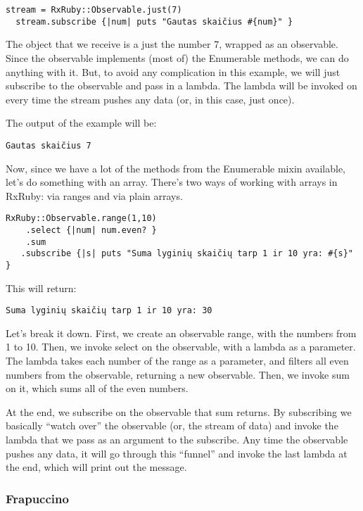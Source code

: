 \begin{lstlisting}[]
  stream = RxRuby::Observable.just(7)
  stream.subscribe {|num| puts "Gautas skaičius #{num}" }
\end{lstlisting}

The object that we receive is a just the number 7, wrapped as an observable. Since the observable implements (most of) the Enumerable methods, we can do anything with it. But, to avoid any complication in this example, we will just subscribe to the observable and pass in a lambda. The lambda will be invoked on every time the stream pushes any data (or, in this case, just once).

The output of the example will be:

\begin{lstlisting}[]
  Gautas skaičius 7
\end{lstlisting}

Now, since we have a lot of the methods from the Enumerable mixin available, let’s do something with an array. There’s two ways of working with arrays in RxRuby: via ranges and via plain arrays.

\begin{lstlisting}[]
  RxRuby::Observable.range(1,10)
    .select {|num| num.even? }
    .sum
   .subscribe {|s| puts "Suma lyginių skaičių tarp 1 ir 10 yra: #{s}" }
\end{lstlisting}

This will return:

\begin{lstlisting}[]
  Suma lyginių skaičių tarp 1 ir 10 yra: 30
\end{lstlisting}

Let’s break it down. First, we create an observable range, with the numbers from 1 to 10. Then, we invoke select on the observable, with a lambda as a parameter. The lambda takes each number of the range as a parameter, and filters all even numbers from the observable, returning a new observable. Then, we invoke sum on it, which sums all of the even numbers.

At the end, we subscribe on the observable that sum returns. By subscribing we basically “watch over” the observable (or, the stream of data) and invoke the lambda that we pass as an argument to the subscribe. Any time the observable pushes any data, it will go through this “funnel” and invoke the last lambda at the end, which will print out the message.

\subsubsection{Frapuccino}

